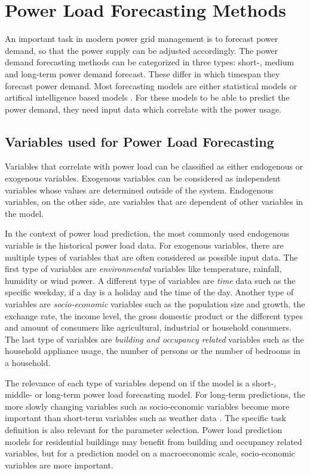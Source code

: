 \section{Power Load Forecasting Methods}
\label{powerloadsection}

An important task in modern power grid management 
is to forecast power demand, so that the power supply can be adjusted accordingly.
The power demand forecasting methods can be categorized in three types:
short-, medium and long-term power demand forecast. These differ in which
timespan they forecast power demand. Most forecasting models are 
either statistical models or artifical intelligence based models 
\cite{raza2015review}. For these models to be able to predict the power 
demand, they need input data which correlate with the power 
usage. 

\subsection{Variables used for Power Load Forecasting}
\label{variabledependency}
Variables that correlate with power load 
can be classified as either endogenous or exogenous variables.
Exogenous variables can be considered as independent variables 
whose values are determined outside of the system. 
Endogenous variables, on the other side, 
are variables that are dependent of other variables in the 
model.

In the context of power load prediction, the most commonly 
used endogenous variable is the historical power load data.
For exogenous variables, there are multiple types of 
variables that are often considered as possible input data.
The first type of variables are \textit{environmental} variables like temperature, 
rainfall, humidity or wind power. A different type of variables are \textit{time} data
such as the specific weekday, if a day is a holiday and the time of the day.
Another type of variables are \textit{socio-economic} variables such as the
population size and growth, the exchange rate, the income level,
the gross domestic product or the different types and amount 
of consumers like agricultural, industrial or household consumers.
The last type of variables are \textit{building and occupancy related} variables such
as the household appliance usage,
the number of persons or the number of bedrooms in a household.

The relevance of each type of variables depend on if the model is
a short-, middle- or long-term power load forecasting model. For 
long-term predictions, the more slowly changing variables such as socio-economic
variables become more important than short-term variables such as weather data 
\cite{loadforecastingtimedependency2}\cite{loadforecastingtimedependency}.
The specific task definition is also relevant for the parameter selection.
Power load prediction models for residential buildings may benefit from 
building and occupancy related variables, but for a prediction model on a 
macroeconomic scale, socio-economic variables are more important.

